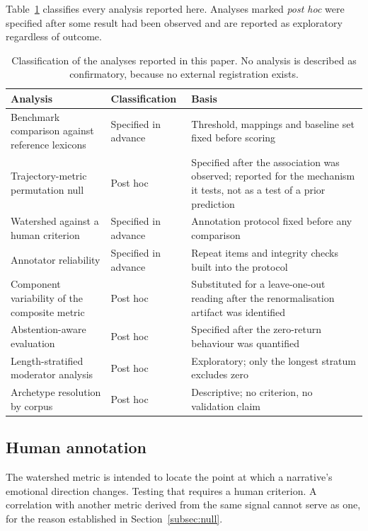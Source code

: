 \documentclass[fleqn,10pt]{wlscirep}
\providecommand{\botrule}{\bottomrule}
\begin{document}
Table~\ref{tab:dev} classifies every analysis reported here. Analyses marked \emph{post hoc} were specified after some result had been observed and are reported as exploratory regardless of outcome.

\begin{table}[ht]
\centering
\small
\caption{Classification of the analyses reported in this paper. No analysis is described as confirmatory, because no external registration exists.}
\label{tab:dev}
\begin{tabular}{p{5.0cm}p{3.0cm}p{5.4cm}}
\toprule
Analysis & Classification & Basis \\
\midrule
Benchmark comparison against reference lexicons & Specified in advance & Threshold, mappings and baseline set fixed before scoring \\
Trajectory-metric permutation null & Post hoc & Specified after the association was observed; reported for the mechanism it tests, not as a test of a prior prediction \\
Watershed against a human criterion & Specified in advance & Annotation protocol fixed before any comparison \\
Annotator reliability & Specified in advance & Repeat items and integrity checks built into the protocol \\
Component variability of the composite metric & Post hoc & Substituted for a leave-one-out reading after the renormalisation artifact was identified \\
Abstention-aware evaluation & Post hoc & Specified after the zero-return behaviour was quantified \\
Length-stratified moderator analysis & Post hoc & Exploratory; only the longest stratum excludes zero \\
Archetype resolution by corpus & Post hoc & Descriptive; no criterion, no validation claim \\
\botrule
\end{tabular}
\end{table}

\subsection{Human annotation}\label{subsec:annotation}

The watershed metric is intended to locate the point at which a narrative's emotional direction changes. Testing that requires a human criterion. A correlation with another metric derived from the same signal cannot serve as one, for the reason established in Section~\ref{subsec:null}.
\end{document}
